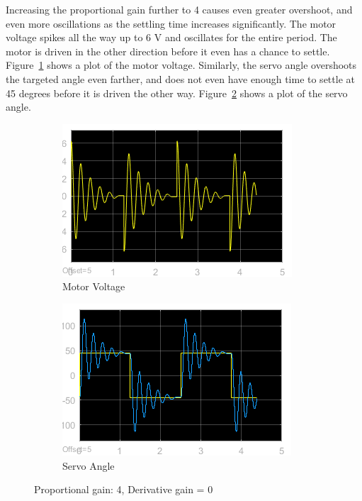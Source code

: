 \documentclass[12pt]{article}
\begin{document}
Increasing the proportional gain further to 4 causes even greater overshoot, and even more oscillations as the settling time increases significantly. The motor voltage spikes all the way up to 6 V and oscillates for the entire period. The motor is driven in the other direction before it even has a chance to settle. Figure~\ref{fig:x_volt} shows a plot of the motor voltage. Similarly, the servo angle overshoots the targeted angle even farther, and does not even have enough time to settle at 45 degrees before it is driven the other way. Figure~\ref{fig:x_angle} shows a plot of the servo angle.
\begin{figure}[h!]
    \centering
    \begin{subfigure}[b]{0.49\textwidth}
        \includegraphics[width=\textwidth]{x_voltage}
        \caption{\label{fig:x_volt}Motor Voltage}
    \end{subfigure}
    \begin{subfigure}[b]{0.49\textwidth}
        \includegraphics[width=\textwidth]{x_angle}
        \caption{\label{fig:x_angle}Servo Angle}
    \end{subfigure}
    \caption{\label{fig:x} Proportional gain: 4, Derivative gain = 0}
\end{figure}
\end{document}
